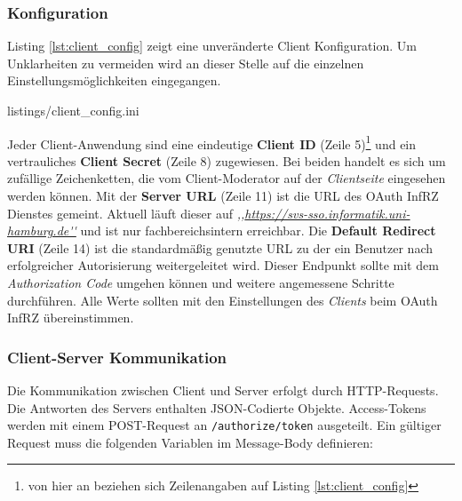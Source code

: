 \documentclass[12pt,a4paper,pointednumbers,abstracton]{scrartcl}
\newcommand{\code}[1]{\small\lstinline[style=InlinePHP]!#1!\normalsize}
\begin{document}
\subsubsection{Konfiguration}

Listing \ref{lst:client_config} zeigt eine unveränderte Client Konfiguration.
Um Unklarheiten zu vermeiden wird an dieser Stelle auf die einzelnen Einstellungsmöglichkeiten eingegangen.

\begin{minipage}{\textwidth}
	
	{listings/client_config.ini}
\end{minipage}

Jeder Client-Anwendung sind eine eindeutige \textbf{Client ID} (Zeile 5)\footnote{von hier an beziehen sich Zeilenangaben auf Listing \ref{lst:client_config}} und ein vertrauliches \textbf{Client Secret} (Zeile 8) zugewiesen.
Bei beiden handelt es sich um zufällige Zeichenketten, die vom Client-Moderator auf der \emph{Clientseite} eingesehen werden können.
Mit der \textbf{Server URL} (Zeile 11) ist die URL des OAuth InfRZ Dienstes gemeint.
Aktuell läuft dieser auf \emph{,,\url{https://svs-sso.informatik.uni-hamburg.de''}} und ist nur fachbereichsintern erreichbar.
Die \textbf{Default Redirect URI} (Zeile 14) ist die standardmäßig genutzte URL zu der ein Benutzer nach erfolgreicher Autorisierung weitergeleitet wird.
Dieser Endpunkt sollte mit dem \emph{Authorization Code} umgehen können und weitere angemessene Schritte durchführen.
Alle Werte sollten mit den Einstellungen des \emph{Clients} beim OAuth InfRZ übereinstimmen.

\subsubsection{Client-Server Kommunikation}
\label{sec:client/communication}

Die Kommunikation zwischen Client und Server erfolgt durch HTTP-Requests.
Die Antworten des Servers enthalten JSON-Codierte Objekte.
Access-Tokens werden mit einem POST-Request an \code{/authorize/token} ausgeteilt.
Ein gültiger Request muss die folgenden Variablen im Message-Body definieren:
\end{document}
